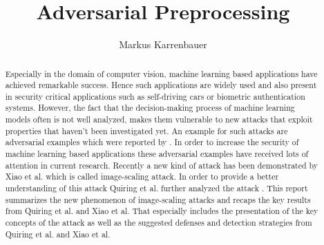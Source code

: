 \documentclass[sigconf]{acmart}
\begin{document}
\title{Adversarial Preprocessing}

\author{Markus Karrenbauer}

\renewcommand{\shortauthors}{Karrenbauer}

\begin{abstract}
Especially in the domain of computer vision, machine learning based applications have achieved remarkable success.
Hence such applications are widely used and also present in security critical applications such as self-driving cars or biometric authentication systems.
However, the fact that the decision-making process of machine learning models often is not well analyzed, makes them vulnerable to new attacks that exploit properties that haven't been investigated yet.
An example for such attacks are adversarial examples which were reported by \cite{intr}.
In order to increase the security of machine learning based applications these adversarial examples have received lots of attention in current research.
Recently a new kind of attack has been demonstrated by Xiao et al.\cite{camouflage} which is called image-scaling attack.
In order to provide a better understanding of this attack Quiring et al. further analyzed the attack \cite{imgscale, imgscalepoison}.
This report summarizes the new phenomenon of image-scaling attacks and recaps the key results from Quiring et al. and Xiao et al.
That especially includes the presentation of the key concepts of the attack as well as the suggested defenses and detection strategies from Quiring et al. and Xiao et al.
\end{abstract}
\end{document}

